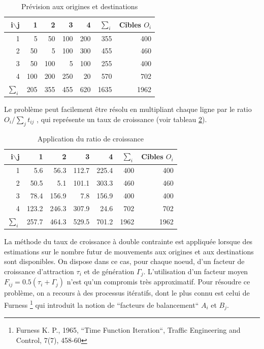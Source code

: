 \begin{table}[htbp]
\begin{center}
\begin{tabular}{rrrrrrr}
\hline
i$\backslash$j & 1 & 2 & 3 & 4 & $\sum\limits_{i}$ & Cibles $O_i$\\
\hline
1 & 5 & 50 & 100 & 200 & 355 & 400\\ 2 & 50 & 5 & 100 & 300 & 455 & 460\\

3 & 50 & 100 & 5 & 100 & 255 & 400\\ 4 & 100 & 200 & 250 & 20 & 570 & 702\\
$\sum\limits_{i}$ & 205 & 355 & 455 & 620 & 1635 & 1962\\
\hline
\end{tabular}
\caption{\label{tab2_1} Pr\'evision aux origines et destinations}
\end{center}
\end{table}


Le problème peut facilement être résolu en multipliant chaque ligne par le ratio
$O_i/\sum\limits_jt_{ij}$ , qui représente un taux de croissance (voir tableau
\ref{tab2_2}).

\begin{table}[htbp]
\begin{center}
\begin{tabular}{rrrrrrr}
\hline
i$\backslash$j & 1 & 2 & 3 & 4 & $\sum\limits_{i}$ & Cibles $O_i$\\
\hline
1 & 5.6 & 56.3 & 112.7 & 225.4 & 400 & 400\\

2 & 50.5 & 5.1 & 101.1 & 303.3 & 460 & 460\\

3 & 78.4 & 156.9 & 7.8 & 156.9 & 400 & 400\\

4 & 123.2 & 246.3 & 307.9 & 24.6 & 702 & 702\\

$\sum\limits_{i}$ & 257.7 & 464.3 & 529.5 & 701.2 & 1962 & 1962\\
\hline
\end{tabular}
\caption{\label{tab2_2} Application du ratio de croissance}
\end{center}
\end{table}



La méthode du taux de croissance à double contrainte est appliquée lorsque des
estimations sur le nombre futur de mouvements aux origines et aux destinations
sont disponibles. On dispose dans ce cas, pour chaque noeud, d'un facteur de
croissance d'attraction $\tau_i$ et de génération $\Gamma_j$. L'utilisation d'un
facteur moyen $F_{ij}=0.5(\tau_i+\Gamma_j)$ n'est qu'un compromis très
approximatif. Pour résoudre ce problème, on a recours à des processus itératifs,
dont le plus connu est celui de Furness
\footnote{ Furness K. P., 1965, ``Time Function Iteration``,
Traffic Engineering and Control, 7(7), 458-60} qui introduit la
notion de ``facteurs de balancement`` $A_i$ et $B_j$.

